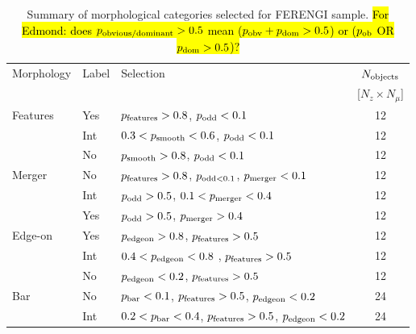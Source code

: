 \documentclass[usenatbib]{mn2e}
\begin{document}
\begin{table}
\caption{Summary of morphological categories selected for FERENGI sample. \hl{For Edmond: does $p_{\rm obvious/dominant}>0.5$ mean ($p_{\rm obv}+p_{\rm dom}>0.5$) or ($p_{\rm ob}$ OR $p_{\rm dom} >0.5$)?}\label{morphologies}}
\begin{tabular}{lllc}
\hline\hline
Morphology          & Label &  Selection                                                                                            & $N_{\rm objects}$ \\
                    &       &                                                                                                       & [$N_z \times N_\mu$] \\
\hline
Features            & Yes   & $p_{\rm features} > 0.8$, $p_{\rm odd} < 0.1$                                                         & 12 \\ 
                    & Int   & $0.3 < p_{\rm smooth} < 0.6$, $p_{\rm odd} < 0.1$                                                     & 12 \\ 
                    & No    & $p_{\rm smooth} > 0.8$, $p_{\rm odd} < 0.1$                                                           & 12 \\ 
Merger              & No    & $p_{\rm features} > 0.8$, $p_{\rm odd < 0.1}$, $p_{\rm merger} < 0.1$                                 & 12 \\
                    & Int   & $p_{\rm odd} > 0.5$, $0.1< p_{\rm merger} < 0.4$                                                      & 12 \\ 
                    & Yes   & $p_{\rm odd} > 0.5$, $p_{\rm merger} > 0.4$                                                           & 12 \\
Edge-on             & Yes   & $p_{\rm edgeon} > 0.8$, $p_{\rm features} > 0.5$                                                      & 12 \\
                    & Int   & $0.4 < p_{\rm edgeon} < 0.8$ , $p_{\rm features} > 0.5$                                               & 12 \\
                    & No    & $p_{\rm edgeon} < 0.2$, $p_{\rm features} > 0.5$                                                      & 12 \\
Bar                 & No    & $p_{\rm bar} < 0.1$, $p_{\rm features} > 0.5$, $p_{\rm edgeon} < 0.2$                                 & 24 \\
                    & Int   & $0.2 < p_{\rm bar} < 0.4$, $p_{\rm features} > 0.5$, $p_{\rm edgeon} < 0.2$                           & 24 \\

\end{tabular}
\end{table}
\end{document}
